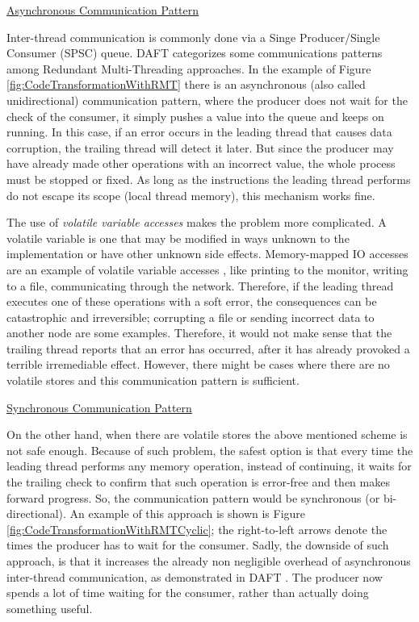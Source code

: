 \begin{flushleft}
\underline{Asynchronous Communication Pattern}
\end{flushleft}

Inter-thread communication is commonly done via a Singe Producer/Single Consumer (SPSC) queue. DAFT \cite{zhang2012daft} categorizes some communications patterns among Redundant Multi-Threading approaches. In the example of Figure \ref{fig:CodeTransformationWithRMT} there is an asynchronous (also called unidirectional) communication pattern, where the producer does not wait for the check of the consumer, it simply pushes a value into the queue and keeps on running. In this case, if an error occurs in the leading thread that causes data corruption, the trailing thread will detect it later. But since the producer may have already made other operations with an incorrect value, the whole process must be stopped or fixed. As long as the instructions the leading thread performs do not escape its scope (local thread memory), this mechanism works fine. 

The use of \textit{volatile variable accesses} makes the problem more complicated. A volatile variable is one that may be modified in ways unknown to the implementation or have other unknown side effects. Memory-mapped IO accesses are an example of volatile variable accesses \cite{zhang2012daft}, like printing to the monitor, writing to a file, communicating through the network. Therefore, if the leading thread executes one of these operations with a soft error, the consequences can be catastrophic and irreversible; corrupting a file or sending incorrect data to another node are some examples. Therefore, it would not make sense that the trailing thread reports that an error has occurred, after it has already provoked a terrible irremediable effect. However, there might be cases where there are no volatile stores and this communication pattern is sufficient.

\begin{flushleft}
\underline{Synchronous Communication Pattern}
\end{flushleft}

On the other hand, when there are volatile stores the above mentioned scheme is not safe enough. Because of such problem, the safest option is that every time the leading thread performs any memory operation, instead of continuing, it waits for the trailing check to confirm that such operation is error-free and then makes forward progress. So, the communication pattern would be synchronous (or bi-directional). An example of this approach is shown is Figure \ref{fig:CodeTransformationWithRMTCyclic}; the right-to-left arrows denote the times the producer has to wait for the consumer. Sadly, the downside of such approach, is that it increases the already non negligible overhead of asynchronous inter-thread communication, as demonstrated in DAFT \cite{zhang2012daft}. The producer now spends a lot of time waiting for the consumer, rather than actually doing something useful. 

